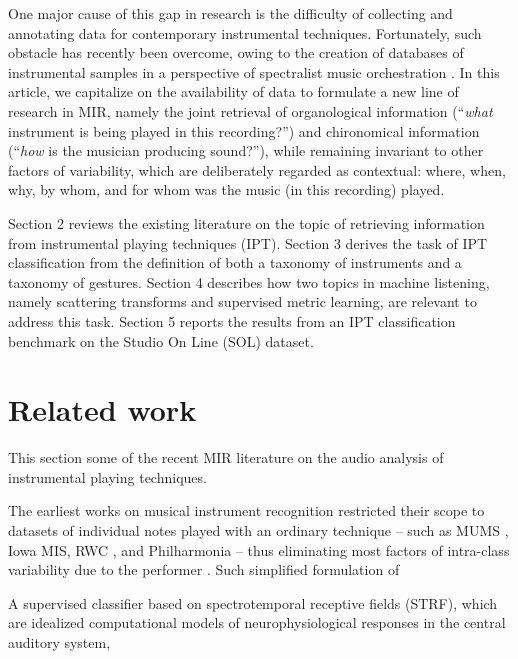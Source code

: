 \documentclass{article}
\begin{document}
One major cause of this gap in research is the difficulty of collecting and annotating data for contemporary instrumental techniques.
Fortunately, such obstacle has recently been overcome, owing to the creation of databases of instrumental samples in a perspective of spectralist music orchestration \cite{maresz2013cmr}.
In this article, we capitalize on the availability of data to formulate a new line of research in MIR, namely the joint retrieval of organological information (``\emph{what} instrument is being played in this recording?'') and chironomical information (``\emph{how} is the musician producing sound?''), while remaining invariant to other factors of variability, which are deliberately regarded as contextual: where, when, why, by whom, and for whom was the music (in this recording) played.

Section 2 reviews the existing literature on the topic of retrieving information from instrumental playing techniques (IPT).
Section 3 derives the task of IPT classification from the definition of both a taxonomy of instruments and a taxonomy of gestures.
Section 4 describes how two topics in machine listening, namely scattering transforms and supervised metric learning, are relevant to address this task.
Section 5 reports the results from an IPT classification benchmark on the Studio On Line (SOL) dataset.


\section{Related work}
This section some of the recent MIR literature on the audio analysis of instrumental playing techniques.

The earliest works on musical instrument recognition restricted their scope to datasets of individual notes played with an ordinary technique -- such as MUMS \cite{opolko1989dataset}, Iowa MIS, RWC \cite{goto2003ismir}, and Philharmonia -- thus eliminating most factors of intra-class variability due to the performer  \cite{martin1998asa,brown1999jasa,eronen2000icassp,herrera2003jnmr,wieczorkowska2003jiis,kaminskyj2005jiis,benetos2006icassp}.
Such simplified formulation of 

A supervised classifier based on spectrotemporal receptive fields (STRF), which are idealized computational models of neurophysiological responses in the central auditory system, 
\end{document}
